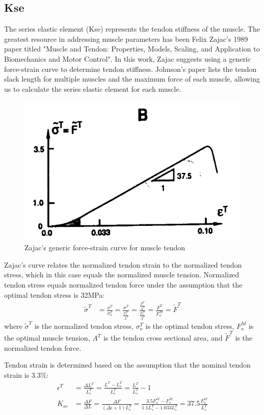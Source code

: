 \documentclass[runningheads,a4paper]{llncs}
\begin{document}
	\subsection{Kse}
		The series elastic element (Kse) represents the tendon stiffness of the muscle. The greatest resource in addressing muscle parameters has been Felix Zajac's 1989 paper titled "Muscle and Tendon: Properties, Models, Scaling, and Application to Biomechanics and Motor Control"\cite{zajac_muscle_1989}. In this work, Zajac suggests using a generic force-strain curve to determine tendon stiffness. Johnson's paper lists the tendon slack length for multiple muscles and the maximum force of each muscle, allowing us to calculate the series elastic element for each muscle.
			\begin{figure}
				\centering
				\includegraphics[width=.5\textwidth]{zajac1.PNG}
				\caption{Zajac's generic force-strain curve for muscle tendon}
				\label{fig:zajac1}
			\end{figure}
		Zajac's curve relates the normalized tendon strain to the normalized tendon stress, which in this case equals the normalized muscle tension. Normalized tendon stress equals normalized tendon force under the assumption that the optimal tendon stress is 32MPa:
			\begin{align*}
				\tilde{\sigma}^{T} &= \frac{\sigma^{T}}{\sigma_{o}^{T}}
				= \frac{\sigma^{T}}{\frac{F_{o}^{M}}{A^{T}}}
				= \frac{\frac{F^{T}}{A^{T}}}{\frac{F_{o}^{M}}{A^{T}}}
				= \frac{F^{T}}{F_{o}^{M}}
				= \tilde{F}^{T}
			\end{align*}
		where $\tilde{\sigma}^{T}$ is the normalized tendon stress, $\sigma_{o}^{T}$ is the optimal tendon stress, $F_{o}^{M}$ is the optimal muscle tension, $A^{T}$ is the tendon cross sectional area, and $\tilde{F}^{T}$ is the normalized tendon force. \par
		Tendon strain is determined based on the assumption that the nominal tendon strain is 3.3\%:
			\begin{align*}
				\epsilon^{T} &= \frac{\Delta L^{T}}{L_{s}^{T}}
				= \frac{L^{T}-L_{s}^{T}}{L_{s}^{T}}
				= \frac{L^{T}}{L_{s}^{T}} - 1 \\
				K_{se} &= \frac{\Delta F}{\Delta L}
				= \frac{\Delta F}{(\Delta \epsilon+1)L_{s}^{T}}
				= \frac{3.5 F_{o}^{M} - F_{o}^{M}}{1.1 L_{s}^{T} - 1.033 L_{s}^{T}}
				= 37.5 \frac{F_{o}^{M}}{L_{s}^{T}}
			\end{align*}
\end{document}
